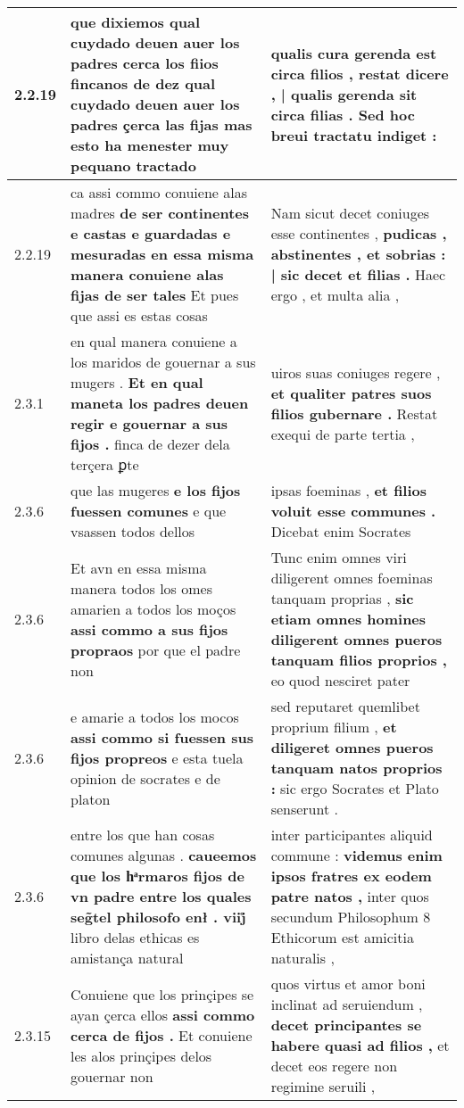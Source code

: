 \begin{tabular}{|p{1cm}|p{6.5cm}|p{6.5cm}|}
2.2.19 & que dixiemos qual cuydado deuen auer los padres \textbf{ cerca los fiios fincanos de dez qual cuydado deuen auer los padres çerca las fijas } mas esto ha menester muy pequano tractado & qualis cura gerenda est circa filios , \textbf{ restat dicere , | qualis gerenda sit circa filias . } Sed hoc breui tractatu indiget : \\\hline
2.2.19 & ca assi commo conuiene alas madres \textbf{ de ser continentes e castas e guardadas e mesuradas en essa misma manera conuiene alas fijas de ser tales } Et pues que assi es estas cosas & Nam sicut decet coniuges esse continentes , \textbf{ pudicas , abstinentes , et sobrias : | sic decet et filias . } Haec ergo , et multa alia , \\\hline
2.3.1 & en qual manera conuiene a los maridos de gouernar a sus mugers . \textbf{ Et en qual maneta los padres deuen regir e gouernar a sus fijos . } finca de dezer dela terçera ꝑte & uiros suas coniuges regere , \textbf{ et qualiter patres suos filios gubernare . } Restat exequi de parte tertia , \\\hline
2.3.6 & que las mugeres \textbf{ e los fijos fuessen comunes } e que vsassen todos dellos & ipsas foeminas , \textbf{ et filios voluit esse communes . } Dicebat enim Socrates \\\hline
2.3.6 & Et avn en essa misma manera todos los omes amarien a todos los moços \textbf{ assi commo a sus fijos propraos } por que el padre non & Tunc enim omnes viri diligerent omnes foeminas tanquam proprias , \textbf{ sic etiam omnes homines diligerent omnes pueros tanquam filios proprios , } eo quod nesciret pater \\\hline
2.3.6 & e amarie a todos los mocos \textbf{ assi commo si fuessen sus fijos propreos } e esta tuela opinion de socrates e de platon & sed reputaret quemlibet proprium filium , \textbf{ et diligeret omnes pueros tanquam natos proprios : } sic ergo Socrates et Plato senserunt . \\\hline
2.3.6 & entre los que han cosas comunes algunas . \textbf{ caueemos que los hͣrmaros fijos de vn padre entre los quales seg̃tel philosofo enł . viij̊ } libro delas ethicas es amistança natural & inter participantes aliquid commune : \textbf{ videmus enim ipsos fratres ex eodem patre natos , } inter quos secundum Philosophum 8 Ethicorum est amicitia naturalis , \\\hline
2.3.15 & Conuiene que los prinçipes se ayan çerca ellos \textbf{ assi commo cerca de fijos . } Et conuiene les alos prinçipes delos gouernar non & quos virtus et amor boni inclinat ad seruiendum , \textbf{ decet principantes se habere quasi ad filios , } et decet eos regere non regimine seruili , \\\hline

\end{tabular}
